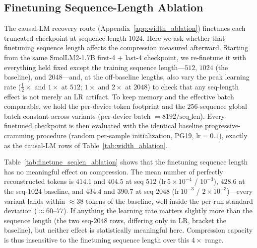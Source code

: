 %     




\subsection{Finetuning Sequence-Length Ablation}
\label{app:finetune_seqlen_ablation}

The causal-LM recovery route (Appendix~\ref{app:width_ablation}) finetunes each truncated checkpoint at sequence length $1024$. Here we ask whether that finetuning sequence length affects the compression measured afterward. Starting from the same SmolLM2-1.7B first-4 + last-4 checkpoint, we re-finetune it with everything held fixed except the training sequence length---$512$, $1024$ (the baseline), and $2048$---and, at the off-baseline lengths, also vary the peak learning rate ($\tfrac12\times$ and $1\times$ at $512$; $1\times$ and $2\times$ at $2048$) to check that any seq-length effect is not merely an LR artifact. To keep memory and the effective batch comparable, we hold the per-device token footprint and the $256$-sequence global batch constant across variants (per-device batch $=8192 / \text{seq\_len}$). Every finetuned checkpoint is then evaluated with the identical baseline progressive-cramming procedure (random per-sample initialization, PG19, $\mathrm{lr}=0.1$), exactly as the causal-LM rows of Table~\ref{tab:width_ablation}.

Table~\ref{tab:finetune_seqlen_ablation} shows that the finetuning sequence length has no meaningful effect on compression. The mean number of perfectly reconstructed tokens is $414.1$ and $404.5$ at seq $512$ ($\mathrm{lr}\,5\times10^{-4}$ / $10^{-3}$), $428.6$ at the seq-$1024$ baseline, and $434.4$ and $390.7$ at seq $2048$ ($\mathrm{lr}\,10^{-3}$ / $2\times10^{-3}$)---every variant lands within ${\approx}38$ tokens of the baseline, well inside the per-run standard deviation (${\approx}60$--$77$). If anything the learning rate matters slightly more than the sequence length (the two seq-$2048$ rows, differing only in LR, bracket the baseline), but neither effect is statistically meaningful here. Compression capacity is thus insensitive to the finetuning sequence length over this $4\times$ range.

